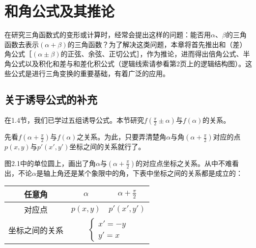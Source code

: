 \chapter{和角公式及其推论}
在研究三角函数式的变形或计算时，经常会提出这样的问题：能否用$\alpha$、$\beta$的三角函数去表示$(\alpha+\beta)$的三角函数？为了解决这类问题，本章将首先推出和（差）角公式［$(\alpha\pm\beta)$的正弦、余弦、正切公式］，作为推论，进而得出倍角公式、半角公式以及积化和差与和差化积公式（逻辑线索请参看第2页上的逻辑结构图）。这些公式是进行三角变换的重要基础，有着广泛的应用。

\section{关于诱导公式的补充}
在1.4节，我们已学过五组诱导公式。本节研究$f\left(\frac{\pi}{2}\pm\alpha\right)$与$f(\alpha)$的关系。

先看$f\left(\alpha+\frac{\pi}{2}\right)$与$f(\alpha)$之关系。为此，只要弄清楚角$\alpha$与角$\left(\alpha+\frac{\pi}{2}\right)$对应的点$p(x,y)$与$p'(x',y')$坐标之间的关系就行了。

\begin{figure}[htp]
    \centering
{}
    \caption{}
\end{figure}


图2.1中的单位圆上，画出了角$\alpha$与$\left(\alpha+\frac{\pi}{2}\right)$的对应点坐标之关系。从中不难看出，不论$\alpha$是轴上角还是某个象限中的角，下表中坐标之间的关系都是成立的：

\begin{center}
\begin{tabular}{c|c|c}
    \hline
    任意角& $\alpha$&$\alpha+\frac{\pi}{2}$\\[1.5ex]
    \hline
    对应点& $p(x,y)$&$p'(x',y')$\\
    \hline
    坐标之间的关系& \multicolumn{2}{c}{$\begin{cases}
        x'=-y\\ y'=x
    \end{cases}$}\\
    \hline
\end{tabular}
\end{center}

